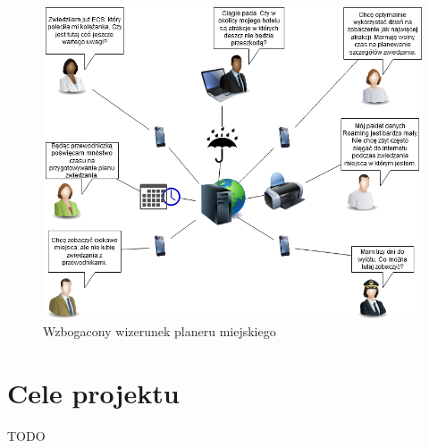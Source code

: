\begin{figure}[h]
    \centering
    \includegraphics[width=1\textwidth]{attachments/rich-picture}
    \caption{Wzbogacony wizerunek planeru miejskiego}
    \label{fig:rich-picture}
\end{figure}

\pagebreak
\section{Cele projektu}
\label{sec:cele-projektu}

TODO

